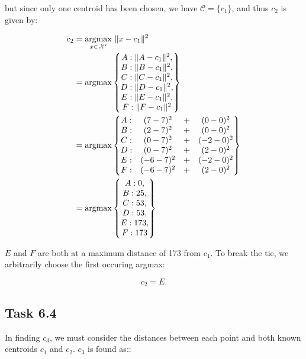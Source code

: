 \newpage
but since only one centroid has been chosen, we have $\mathcal C = \{c_1\}$, and
thus $c_2$ is given by:

\begin{alignat*}{3}
c_2 &= \operatorname*{argmax}_{x \in\, \mathcal {X}'}\  \lVert x - c_1 \rVert ^2\\
    &= \operatorname*{argmax} \left\{
  \begin{matrix}
    A : \lVert A - c_1 \rVert^2,\\
    B : \lVert B - c_1 \rVert^2,\\
    C : \lVert C - c_1 \rVert^2,\\
    D : \lVert D - c_1 \rVert^2,\\
    E : \lVert E - c_1 \rVert^2,\\
    F : \lVert F - c_1 \rVert^2
  \end{matrix}\right\}\\
& = \operatorname*{argmax} \left\{
  \begin{matrix}
    A : &(7  - 7)^2 &+& (0  - 0)^2\\
    B : &(2  - 7)^2 &+& (0  - 0)^2\\
   C : &(0  - 7)^2 &+& (-2  - 0)^2\\
   D : &(0  - 7)^2 &+& (2  - 0)^2\\
   E : &(-6 - 7)^2 &+& (-2 - 0)^2\\
   F : &(-6 - 7)^2 &+& (2  - 0)^2
  \end{matrix}\right\}\\
& = \operatorname*{argmax} \left\{
  \begin{matrix}
    A : 0,\\
    B : 25,\\
    C : 53,\\
    D : 53,\\
    E : 173,\\
    F : 173
  \end{matrix}\right\}
\end{alignat*}

$E$ and $F$ are both at a maximum distance of 173 from $c_1$. To break the tie, we
arbitrarily choose the first occuring argmax:

$$
c_2 = E.
$$
\newpage

\subsection{Task 6.4}

In finding $c_3$, we must consider the distances between each point and both
known centroids $c_1$ and $c_2$. $c_3$ is found as::

